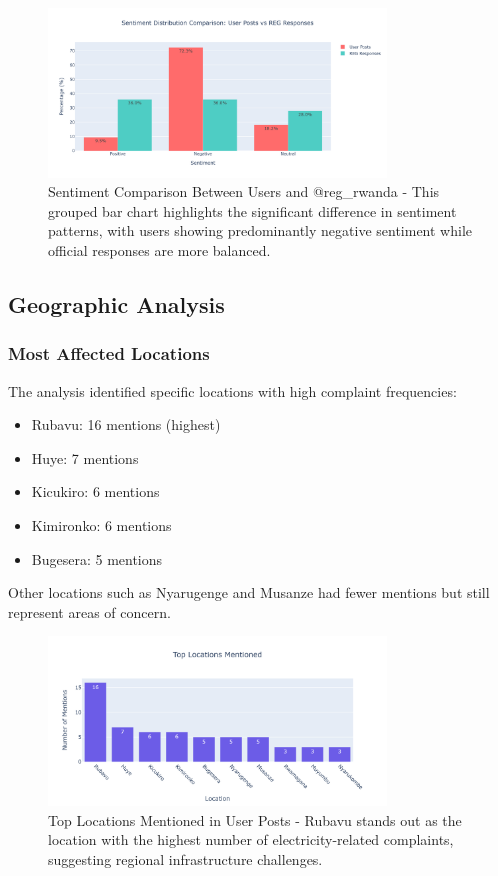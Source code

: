 \documentclass[a4paper,12pt]{article}
\begin{document}
	\begin{figure}[H]
		\centering
		\includegraphics[width=0.8\textwidth]{../results/sentiment_comparison.png}
		\caption{Sentiment Comparison Between Users and @reg\_rwanda - This grouped bar chart highlights the significant difference in sentiment patterns, with users showing predominantly negative sentiment while official responses are more balanced.}
		\label{fig:sentiment_comparison}
	\end{figure}
	
	\subsection{Geographic Analysis}
	
	\subsubsection{Most Affected Locations}
	The analysis identified specific locations with high complaint frequencies:
	\begin{itemize}
		\item Rubavu: 16 mentions (highest)
		\item Huye: 7 mentions
		\item Kicukiro: 6 mentions
		\item Kimironko: 6 mentions
		\item Bugesera: 5 mentions
	\end{itemize}
	
	Other locations such as Nyarugenge and Musanze had fewer mentions but still represent areas of concern.
	
	\begin{figure}[H]
		\centering
		\includegraphics[width=0.8\textwidth]{../results/top_locations.png}
		\caption{Top Locations Mentioned in User Posts - Rubavu stands out as the location with the highest number of electricity-related complaints, suggesting regional infrastructure challenges.}
		\label{fig:top_locations}
	\end{figure}
	
\end{document}
